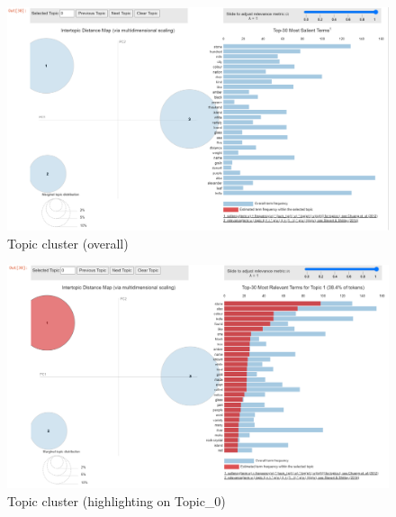 \documentclass[
  12pt,
]{article}
\begin{document}
\begin{figure}

{\centering \includegraphics{NHthesis_structure_files/figure-pdf/fig-topic_cluster0-output-1.png}

}

\caption{\label{fig-topic_cluster0}Topic cluster (overall)}

\end{figure}

\begin{figure}

{\centering \includegraphics{NHthesis_structure_files/figure-pdf/fig-topic_cluster1-output-1.png}

}

\caption{\label{fig-topic_cluster1}Topic cluster (highlighting on
Topic\_0)}

\end{figure}
\end{document}
